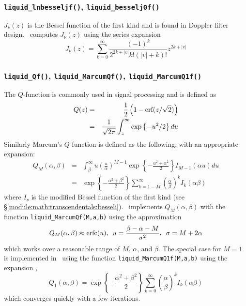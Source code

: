 %
%
\subsubsection{{\tt liquid\_lnbesseljf()},
               {\tt liquid\_besselj0f()}}
\label{module:math:transcendentals:besselj}
$J_\nu(z)$ is the Bessel function of the first kind and is found in
Doppler filter design.
\liquid\ computes $J_\nu(z)$ using the series expansion
%
\begin{equation}
\label{eqn:math:besselj}
    J_\nu(z) =
        \sum_{k=0}^\infty{
            \frac{
                (-1)^k
            }{
                2^{2k+|v|} k! \left(|v|+k\right)!
            }
            z^{2k+|v|}
        }
\end{equation}

%
%
\subsubsection{{\tt liquid\_Qf()},
               {\tt liquid\_MarcumQf()},
               {\tt liquid\_MarcumQ1f()}}
\label{module:math:transcendentals:Q}
The $Q$-function is commonly used in signal processing and is defined as
%
\begin{eqnarray*}
    Q(z) &=& \frac{1}{2}\left(1 - \textup{erf}(z/\sqrt{2})\right) \\
         &=& \frac{1}{\sqrt{2\pi}} \int_{z}^{\infty} { \exp\left\{-u^2/2 \right\} du }
\end{eqnarray*}
%
Similarly Marcum's $Q$-function is defined as the following, with an
appropriate expansion:
%
\begin{eqnarray*}
    Q_M(\alpha,\beta) & = &
        \int_{\beta}^{\infty}{
            u\left(\frac{u}{\alpha}\right)^{M-1}
            \exp\left\{ -\frac{u^2 + \alpha^2}{2}\right\}
            I_{M-1}(\alpha u)
            du
        }\\
        & = &
        \exp\left\{-\frac{\alpha^2 + \beta^2}{2}\right\}
        \sum_{k=1-M}^{\infty}{
            \left(\frac{\alpha}{\beta}\right)^k
            I_k(\alpha\beta)
        }
\end{eqnarray*}
%
where $I_\nu$ is the modified Bessel function of the first kind
(see \S\ref{module:math:transcendentals:besseli}).
\liquid\ implements $Q_M(\alpha,\beta)$ with the function
{\tt liquid\_MarcumQf(M,a,b)} using the approximation
\cite[(25)]{Helstrom:1992}
\[
    Q_M(\alpha,\beta) \approx \textup{erfc}(u),
        \,\,\, u=\frac{\beta-\alpha-M}{\sigma^2},
        \,\,\, \sigma = M + 2\alpha
\]
%
which works over a reasonable range of $M$, $\alpha$, and $\beta$.
%
The special case for $M=1$ is implemented in \liquid\ using the function
{\tt liquid\_MarcumQ1f(M,a,b)} using the expansion \cite{Helstrom:1960},
%
\[
    Q_1(\alpha,\beta) =
        \exp\left\{-\frac{\alpha^2 + \beta^2}{2}\right\}
        \sum_{k=0}^{\infty}{
            \left(\frac{\alpha}{\beta}\right)^k
            I_k(\alpha\beta)
        }
\]
%
which converges quickly with a few iterations.


